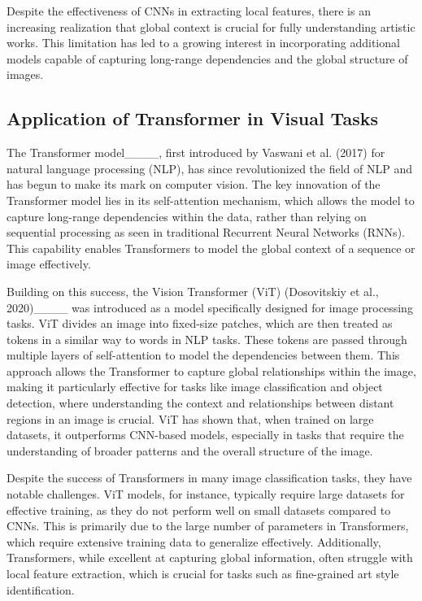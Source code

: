 Despite the effectiveness of CNNs in extracting local features, there is an increasing realization that global context is crucial for fully understanding artistic works. This limitation has led to a growing interest in incorporating additional models capable of capturing long-range dependencies and the global structure of images.

\subsection{Application of Transformer in Visual Tasks}

The Transformer model____, first introduced by Vaswani et al. (2017) for natural language processing (NLP), has since revolutionized the field of NLP and has begun to make its mark on computer vision. The key innovation of the Transformer model lies in its self-attention mechanism, which allows the model to capture long-range dependencies within the data, rather than relying on sequential processing as seen in traditional Recurrent Neural Networks (RNNs). This capability enables Transformers to model the global context of a sequence or image effectively.

Building on this success, the Vision Transformer (ViT) (Dosovitskiy et al., 2020)____ was introduced as a model specifically designed for image processing tasks. ViT divides an image into fixed-size patches, which are then treated as tokens in a similar way to words in NLP tasks. These tokens are passed through multiple layers of self-attention to model the dependencies between them. This approach allows the Transformer to capture global relationships within the image, making it particularly effective for tasks like image classification and object detection, where understanding the context and relationships between distant regions in an image is crucial. ViT has shown that, when trained on large datasets, it outperforms CNN-based models, especially in tasks that require the understanding of broader patterns and the overall structure of the image.

Despite the success of Transformers in many image classification tasks, they have notable challenges. ViT models, for instance, typically require large datasets for effective training, as they do not perform well on small datasets compared to CNNs. This is primarily due to the large number of parameters in Transformers, which require extensive training data to generalize effectively. Additionally, Transformers, while excellent at capturing global information, often struggle with local feature extraction, which is crucial for tasks such as fine-grained art style identification.

